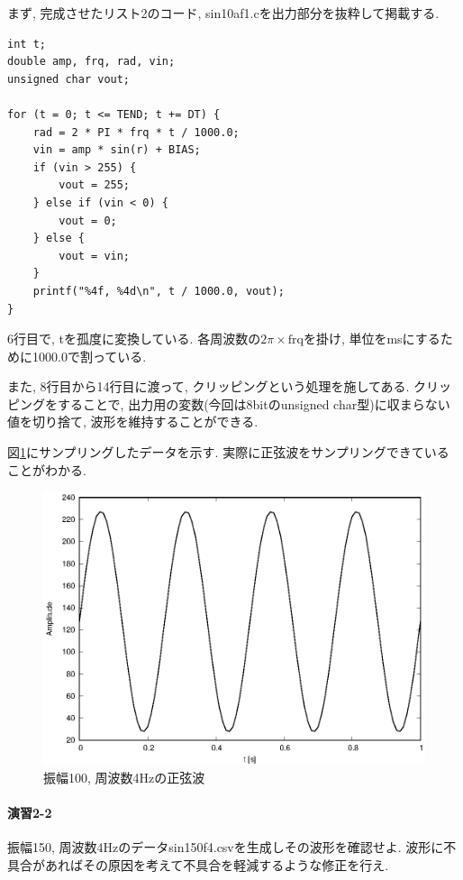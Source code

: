 \documentclass[titlepage]{jsarticle}
\begin{document}
        まず, 完成させたリスト2のコード, sin10af1.cを出力部分を抜粋して掲載する.

        \begin{lstlisting}[caption=sin10af1.c, label=src:sin10af1]
int t;
double amp, frq, rad, vin;
unsigned char vout;

for (t = 0; t <= TEND; t += DT) {
    rad = 2 * PI * frq * t / 1000.0;
    vin = amp * sin(r) + BIAS;
    if (vin > 255) {
        vout = 255;
    } else if (vin < 0) {
        vout = 0;
    } else {
        vout = vin;
    }
    printf("%4f, %4d\n", t / 1000.0, vout);
}\end{lstlisting}

        6行目で, tを孤度に変換している.
        各周波数の$2 \pi \times \mathrm{frq}$を掛け, 単位をmsにするために1000.0で割っている.

        また, 8行目から14行目に渡って, クリッピングという処理を施してある.
        クリッピングをすることで, 出力用の変数(今回は8bitのunsigned char型)に収まらない値を切り捨て,
        波形を維持することができる.

        図\ref{fig:sin100f4}にサンプリングしたデータを示す.
        実際に正弦波をサンプリングできていることがわかる.

        \begin{figure}[ht]
            \centering
            \includegraphics[width=12cm]{images/sin100f4.eps}
            \caption{振幅100, 周波数4Hzの正弦波}
            \label{fig:sin100f4}
        \end{figure}

    \paragraph{演習2-2} 振幅150, 周波数4Hzのデータsin150f4.csvを生成しその波形を確認せよ.
    波形に不具合があればその原因を考えて不具合を軽減するような修正を行え.
        
\end{document}
